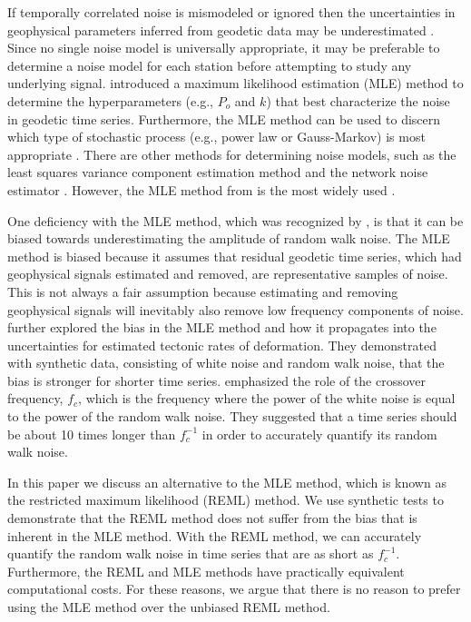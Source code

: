 \documentclass[10pt,a4paper]{article}
\begin{document}
If temporally correlated noise is mismodeled or ignored then the uncertainties in geophysical parameters inferred from geodetic data may be underestimated \citep{Zhang1997}. Since no single noise model is universally appropriate, it may be preferable to determine a noise model for each station before attempting to study any underlying signal. \citet{Langbein1997} introduced a maximum likelihood estimation (MLE) method to determine the hyperparameters (e.g., $P_o$ and $k$) that best characterize the noise in geodetic time series. Furthermore, the MLE method can be used to discern which type of stochastic process (e.g., power law or Gauss-Markov) is most appropriate \citep{Langbein2004}. There are other methods for determining noise models, such as the least squares variance component estimation method \citep{Amiri-Simkooei2007} and the network noise estimator \citep{Dmitrieva2015}. However, the MLE method from \citet{Langbein1997} is the most widely used \citep[e.g.,][]{Langbein2004,Langbein2008,Zhang1997,Mao1999,Williams2004,Hill2009,King2009,Murray2017}.  

One deficiency with the MLE method, which was recognized by \citet{Langbein1997}, is that it can be biased towards underestimating the amplitude of random walk noise. The MLE method is biased because it assumes that residual geodetic time series, which had geophysical signals estimated and removed, are representative samples of noise. This is not always a fair assumption because estimating and removing geophysical signals will inevitably also remove low frequency components of noise. \citet{Langbein2012} further explored the bias in the MLE method and how it propagates into the uncertainties for estimated tectonic rates of deformation. They demonstrated with synthetic data, consisting of white noise and random walk noise, that the bias is stronger for shorter time series. \citet{Langbein2012} emphasized the role of the crossover frequency, $f_c$, which is the frequency where the power of the white noise is equal to the power of the random walk noise. They suggested that a time series should be about 10 times longer than $f_c^{-1}$ in order to accurately quantify its random walk noise. 

In this paper we discuss an alternative to the MLE method, which is known as the restricted maximum likelihood (REML) method.  We use synthetic tests to demonstrate that the REML method does not suffer from the bias that is inherent in the MLE method. With the REML method, we can accurately quantify the random walk noise in time series that are as short as $f_c^{-1}$. Furthermore, the REML and MLE methods have practically equivalent computational costs. For these reasons, we argue that there is no reason to prefer using the MLE method over the unbiased REML method. 
\end{document}
